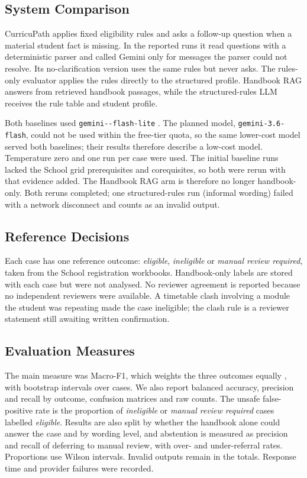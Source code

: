 \subsection{System Comparison}
CurricuPath applies fixed eligibility rules and asks a follow-up question when
a material student fact is missing. In the reported runs it read questions
with a deterministic parser and called Gemini only for messages the parser
could not resolve. Its no-clarification version uses the same rules but never
asks. The rules-only evaluator applies the rules directly to the structured
profile. Handbook RAG answers from retrieved handbook passages, while the
structured-rules LLM receives the rule table and student profile.

Both baselines used \texttt{gemini--\allowbreak flash-\allowbreak lite}
\cite{googleGemini35FlashLite}. The planned model, \texttt{gemini-3.6-flash},
could not be used within the free-tier quota, so the same lower-cost model
served both baselines; their results therefore describe a low-cost model.
Temperature zero and one run per case were used. The initial baseline runs
lacked the School grid prerequisites and corequisites, so both were rerun with
that evidence added. The Handbook RAG arm is therefore no longer
handbook-only. Both reruns completed; one structured-rules run (informal
wording) failed with a network disconnect and counts as an invalid output.

\subsection{Reference Decisions}
Each case has one reference outcome: \textit{eligible}, \textit{ineligible} or
\textit{manual review required}, taken from the School registration
workbooks. Handbook-only labels are stored with each case but were not
analysed. No reviewer agreement is reported because no independent reviewers
were available. A timetable clash involving a module the student was
repeating made the case ineligible; the clash rule is a reviewer statement
still awaiting written confirmation.

\subsection{Evaluation Measures}
The main measure was Macro-F1, which weights the three outcomes equally
\cite{sokolova2009performance}, with bootstrap intervals over cases. We also
report balanced accuracy, precision and recall by outcome, confusion matrices
and raw counts. The unsafe false-positive rate is the proportion of
\textit{ineligible} or \textit{manual review required} cases labelled
\textit{eligible}. Results are also split by whether the handbook alone could
answer the case and by wording level, and abstention is measured as precision
and recall of deferring to manual review, with over- and under-referral
rates. Proportions use Wilson intervals. Invalid outputs remain in the totals.
Response time and provider failures were recorded.

